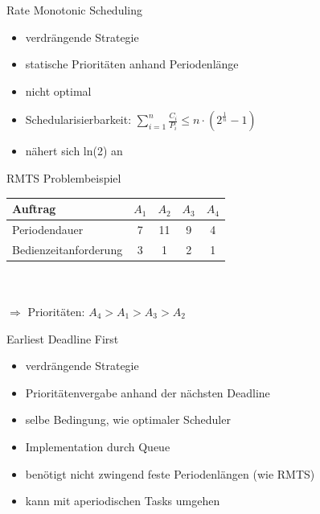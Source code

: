 \begin{frame}{Rate Monotonic Scheduling}
	\begin{itemize}
		\item verdrängende Strategie
		\item statische Prioritäten anhand Periodenlänge
		\item nicht optimal
		\item Schedularisierbarkeit: \(\sum\limits_{i=1}^{n}\frac{C_i}{P_i} \leq n\cdot(2^{\frac{1}{n}}-1)\) \cite{tanenb2009}
		\item nähert sich ln(2) an
	\end{itemize}
\end{frame}

\begin{frame}{RMTS Problembeispiel}
	\begin{center}
	\begin{tabular}{l||c|c|c|c}
		Auftrag               & \(A_1\)  & \(A_2\)  & \(A_3\) & \(A_4\) \\ \hline \hline
		Periodendauer		  & 7        & 11       & 9       & 4       \\ \hline
		Bedienzeitanforderung & 3        &  1       & 2       & 1       \\
	\end{tabular}
	\\ \quad \\ \(\Rightarrow\) Prioritäten: \(A_4 > A_1 > A_3 > A_2\)
	\end{center}
	\begin{center}
	\begin{blockgraph}{25}{1}{0.4}
    
	\end{blockgraph}
	\end{center}
\end{frame}

\begin{frame}{Earliest Deadline First}
	\begin{itemize}
		\item verdrängende Strategie
		\item Prioritätenvergabe anhand der nächsten Deadline
		\item selbe Bedingung, wie optimaler Scheduler
		\item Implementation durch Queue
		\item benötigt nicht zwingend feste Periodenlängen (wie RMTS)
		\item kann mit aperiodischen Tasks umgehen
	\end{itemize}
\end{frame}

